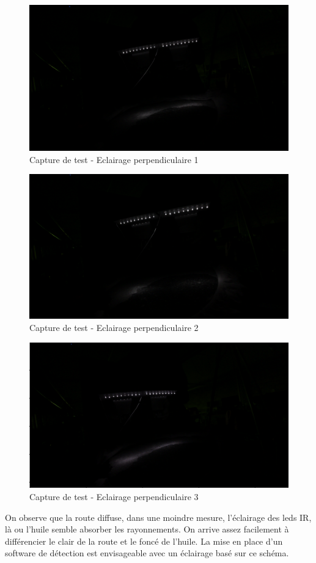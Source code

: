 \begin{figure}[H]
    \centering
    \includegraphics[width=13cm]{assets/figures/eclairage_perpendiculaire1.png}
    \caption{Capture de test - Eclairage perpendiculaire 1}
\end{figure}

\begin{figure}[H]
    \centering
    \includegraphics[width=13cm]{assets/figures/eclairage_perpendiculaire2.png}
    \caption{Capture de test - Eclairage perpendiculaire 2}
\end{figure}

\begin{figure}[H]
    \centering
    \includegraphics[width=13cm]{assets/figures/eclairage_perpendiculaire3.png}
    \caption{Capture de test - Eclairage perpendiculaire 3}
\end{figure}
On observe que la route diffuse, dans une moindre mesure, l'éclairage des leds IR, là ou l'huile semble absorber les rayonnements. On arrive
assez facilement à différencier le clair de la route et le foncé de l'huile. La mise en place d'un software de détection est envisageable avec un éclairage basé sur ce schéma.

